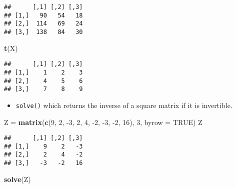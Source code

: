 \documentclass[]{book}
\newenvironment{Shaded}{\begin{snugshade}}{\end{snugshade}}
\newcommand{\DataTypeTok}[1]{\textcolor[rgb]{0.13,0.29,0.53}{#1}}
\newcommand{\DecValTok}[1]{\textcolor[rgb]{0.00,0.00,0.81}{#1}}
\newcommand{\KeywordTok}[1]{\textcolor[rgb]{0.13,0.29,0.53}{\textbf{#1}}}
\newcommand{\NormalTok}[1]{#1}
\newcommand{\OperatorTok}[1]{\textcolor[rgb]{0.81,0.36,0.00}{\textbf{#1}}}
\newcommand{\OtherTok}[1]{\textcolor[rgb]{0.56,0.35,0.01}{#1}}
\newcommand{\StringTok}[1]{\textcolor[rgb]{0.31,0.60,0.02}{#1}}
\providecommand{\tightlist}{%
  \setlength{\itemsep}{0pt}\setlength{\parskip}{0pt}}
\begin{document}
\begin{Shaded}
\end{Shaded}

\begin{verbatim}
##      [,1] [,2] [,3]
## [1,]   90   54   18
## [2,]  114   69   24
## [3,]  138   84   30
\end{verbatim}

\begin{Shaded}
\begin{Highlighting}[]
\KeywordTok{t}\NormalTok{(X)}
\end{Highlighting}
\end{Shaded}

\begin{verbatim}
##      [,1] [,2] [,3]
## [1,]    1    2    3
## [2,]    4    5    6
## [3,]    7    8    9
\end{verbatim}

\begin{itemize}
\tightlist
\item
  \texttt{solve()} which returns the inverse of a square matrix if it is invertible.
\end{itemize}

\begin{Shaded}
\begin{Highlighting}[]
\NormalTok{Z =}\StringTok{ }\KeywordTok{matrix}\NormalTok{(}\KeywordTok{c}\NormalTok{(}\DecValTok{9}\NormalTok{, }\DecValTok{2}\NormalTok{, }\DecValTok{-3}\NormalTok{, }\DecValTok{2}\NormalTok{, }\DecValTok{4}\NormalTok{, }\DecValTok{-2}\NormalTok{, }\DecValTok{-3}\NormalTok{, }\DecValTok{-2}\NormalTok{, }\DecValTok{16}\NormalTok{), }\DecValTok{3}\NormalTok{, }\DataTypeTok{byrow =} \OtherTok{TRUE}\NormalTok{)}
\NormalTok{Z}
\end{Highlighting}
\end{Shaded}

\begin{verbatim}
##      [,1] [,2] [,3]
## [1,]    9    2   -3
## [2,]    2    4   -2
## [3,]   -3   -2   16
\end{verbatim}

\begin{Shaded}
\begin{Highlighting}[]
\KeywordTok{solve}\NormalTok{(Z)}
\end{Highlighting}
\end{Shaded}
\end{document}
